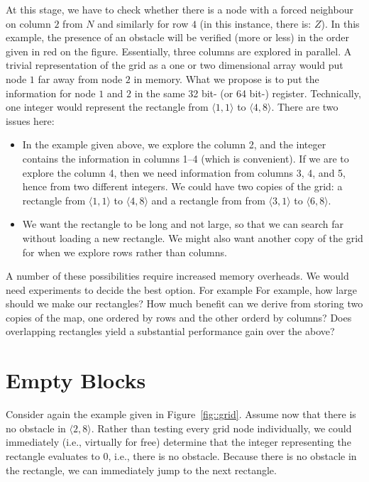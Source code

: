 \documentclass{article}
\begin{document}
At this stage, we have to check 
whether there is a node with a forced neighbour on column $2$ from $N$ 
and similarly for row $4$ (in this instance, there is: $Z$).  
In this example, the presence of an obstacle 
will be verified (more or less) in the order given in red on the figure.  
Essentially, three columns are explored in parallel.  
A trivial representation of the grid as a one or two dimensional array
would put node $1$ far away from node $2$ in memory.  
What we propose is to put the information for node $1$ and $2$ 
in the same 32 bit- (or 64 bit-) register.  
Technically, one integer would represent the rectangle 
from $\langle 1,1\rangle$ to $\langle 4,8\rangle$.  
There are two issues here: 
\begin{itemize}
\item 
  In the example given above, we explore the column 2, 
  and the integer contains the information in columns 1--4 
  (which is convenient).  
  If we are to explore the column 4, 
  then we need information from columns 3, 4, and 5, 
  hence from two different integers.  
  We could have two copies of the grid: 
  a rectangle from $\langle 1,1\rangle$ to $\langle 4,8\rangle$ 
  and a rectangle from from $\langle 3,1\rangle$ to $\langle 6,8\rangle$.  
\item 
  We want the rectangle to be long and not large, 
  so that we can search far without loading a new rectangle.  
  We might also want another copy of the grid for when we explore rows
  rather than columns.
\end{itemize}
A number of these possibilities require increased memory overheads. 
We would need experiments to decide the best option. For example
For example, how large should we make our rectangles? How much benefit can we
derive from storing two copies of the map, one ordered by rows and the other
orderd by columns? Does overlapping rectangles yield a substantial
performance gain over the above?

\section{Empty Blocks}

Consider again the example given in Figure~\ref{fig::grid}.  
Assume now that there is no obstacle in $\langle 2,8\rangle$.  
Rather than testing every grid node individually, 
we could immediately (i.e., virtually for free) determine 
that the integer representing the rectangle 
evaluates to $0$, i.e., there is no obstacle.  
Because there is no obstacle in the rectangle, 
we can immediately jump to the next rectangle.  
\end{document}
